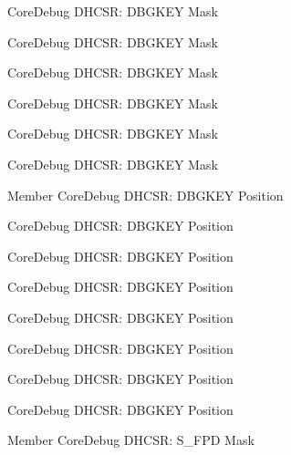\begin{DoxyRefList}
\label{deprecated__deprecated000006}%
%
Core\+Debug DHCSR\+: DBGKEY Mask 

\label{deprecated__deprecated000302}%
%
Core\+Debug DHCSR\+: DBGKEY Mask 

\label{deprecated__deprecated000245}%
%
Core\+Debug DHCSR\+: DBGKEY Mask 

\label{deprecated__deprecated000378}%
%
Core\+Debug DHCSR\+: DBGKEY Mask 

\label{deprecated__deprecated000457}%
%
Core\+Debug DHCSR\+: DBGKEY Mask 

\label{deprecated__deprecated000559}%
%
Core\+Debug DHCSR\+: DBGKEY Mask  
\item[Member \doxylink{group__CMSIS__CoreDebug_gac91280edd0ce932665cf75a23d11d842}{Core\+Debug\+\_\+\+DHCSR\+\_\+\+DBGKEY\+\_\+\+Pos} ]\label{deprecated__deprecated000301}%
%
Core\+Debug DHCSR\+: DBGKEY Position 

\label{deprecated__deprecated000005}%
%
Core\+Debug DHCSR\+: DBGKEY Position 

\label{deprecated__deprecated000105}%
%
Core\+Debug DHCSR\+: DBGKEY Position 

\label{deprecated__deprecated000159}%
%
Core\+Debug DHCSR\+: DBGKEY Position 

\label{deprecated__deprecated000456}%
%
Core\+Debug DHCSR\+: DBGKEY Position 

\label{deprecated__deprecated000558}%
%
Core\+Debug DHCSR\+: DBGKEY Position 

\label{deprecated__deprecated000244}%
%
Core\+Debug DHCSR\+: DBGKEY Position 

\label{deprecated__deprecated000377}%
%
Core\+Debug DHCSR\+: DBGKEY Position  
\item[Member \doxylink{group__CMSIS__SCB_gae37ad624177fe2d3298fd32d528805aa}{Core\+Debug\+\_\+\+DHCSR\+\_\+\+S\+\_\+\+FPD\+\_\+\+Msk} ]\label{deprecated__deprecated000465}%
%
Core\+Debug DHCSR\+: S\+\_\+\+FPD Mask 


\end{DoxyRefList}
